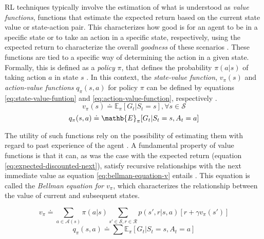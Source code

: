 \documentclass[11pt,a4paper]{article}
\begin{document}
\ac{RL} techniques typically involve the estimation of what is understood as \textit{value functions}, functions that estimate the expected return based on the current state value or state-action pair. This characterizes how good is for an agent to be in a specific state or to take an action in a specific state, respectively, using the expected return to characterize the overall \textit{goodness} of these scenarios \cite{suttonReinforcementLearningIntroduction2014, moralesGrokkingDeepReinforcement2020}. These functions are tied to a specific way of determining the action in a given state. Formally, this is defined as a \textit{policy} $\pi$, that defines the probability $\pi(a|s)$ of taking action $a$ in state $s$ \cite{suttonReinforcementLearningIntroduction2014}. In this context, the \textit{state-value function}, $v_\pi(s)$ and \textit{action-value functions} $q_\pi(s,a)$ for policy $\pi$ can be defined by equations \ref{eq:state-value-funtion} and \ref{eq:action-value-function}, respectively \cite{suttonReinforcementLearningIntroduction2014}.
\begin{equation} \label{eq:state-value-funtion}
    v_\pi(s) \doteq \mathbb{E}_\pi[G_t | S_t = s], \forall s \in \mathcal{S}
\end{equation}
\begin{equation} \label{eq:action-value-function}
    q_\pi(s,a) \doteq \mathb{E}_\pi[G_t | S_t = s, A_t = a]    
\end{equation}

The utility of such functions rely on the possibility of estimating them with regard to past experience of the agent \cite{suttonReinforcementLearningIntroduction2014}. A fundamental property of value functions is that it can, as was the case with the expected return (equation \ref{eq:expected-discounted-next}), satisfy recursive relationships with the next immediate value as equation \ref{eq:bellman-equation-v} entails \cite{suttonReinforcementLearningIntroduction2014}. This equation is called the \textit{Bellman equation for $v_\pi$}, which characterizes the relationship between the value of current and subsequent states.

\begin{equation} \label{eq:bellman-equation-v}
    v_\pi \doteq \sum_{a \in \mathcal{A}(s)} \pi(a|s) \sum_{s' \in \mathcal{S}, r \in \mathcal{R}} p(s',r|s,a) [r + \gamma v_\pi (s')]
\end{equation}
\begin{equation} \label{eq:action-value-function}
    q_\pi(s,a) \doteq \sum\mathbb{E}_\pi[G_t | S_t = s, A_t = a]    
\end{equation}
\end{document}
